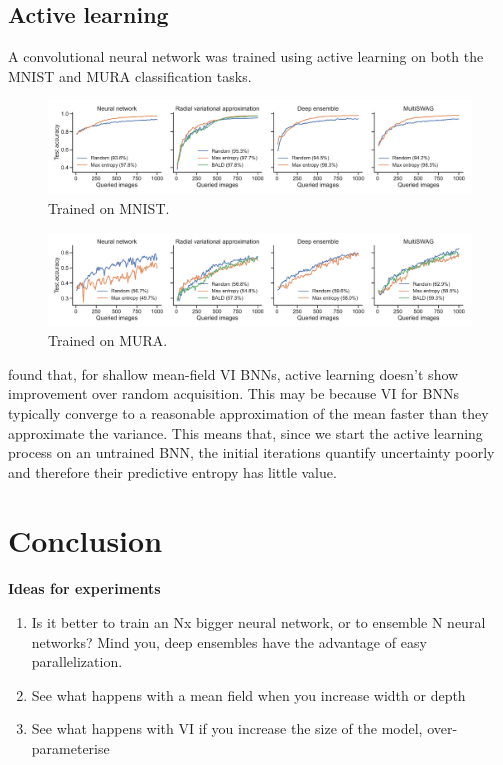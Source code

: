 \documentclass[10pt,a4paper,twocolumn]{article}
\begin{document}
\subsection{Active learning}

A convolutional neural network was trained using active learning on both the MNIST and MURA classification tasks.
%
\begin{figure}
    \centering
    \includegraphics[width=\textwidth]{figures/active_comparison_mnist.pdf}
    \caption{Trained on MNIST.}
    \label{fig:active=mnist}
\end{figure}
%
\begin{figure}
    \centering
    \includegraphics[width=\textwidth]{figures/active_comparison_mura.pdf}
    \caption{Trained on MURA.}
    \label{fig:active-mura}
\end{figure}
\textcite{foong2020expressiveness} found that, for shallow mean-field VI BNNs, active learning doesn't show improvement over random acquisition.
This may be because VI for BNNs typically converge to a reasonable approximation of the mean faster than they approximate the variance.
This means that, since we start the active learning process on an untrained BNN, the initial iterations quantify uncertainty poorly and therefore their predictive entropy has little value.

\section{Conclusion}


\textbf{Ideas for experiments}
\begin{enumerate}
    \item Is it better to train an Nx bigger neural network, or to ensemble N neural networks? Mind you, deep ensembles have the advantage of easy parallelization.
    \item See what happens with a mean field when you increase width or depth
    \item See what happens with VI if you increase the size of the model, over-parameterise
\end{enumerate}
\end{document}
